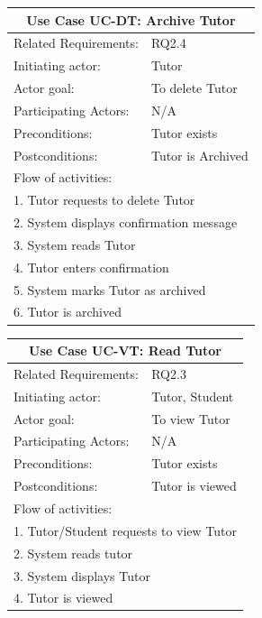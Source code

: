 \documentclass[12pt]{article}
\begin{document}
{		%
		\begin{tabular}{| l | p{10cm}| }
			\hline\multicolumn{2}{|c|}{ \textbf{Use Case UC-DT: Archive Tutor}} \\ \hline
			Related Requirements: & RQ2.4\\ \hline
			Initiating actor: & Tutor\\ \hline
			Actor goal: & To delete Tutor\\ \hline
			Participating Actors: & N/A\\ \hline
			Preconditions:& Tutor exists\\ \hline
			Postconditions: & Tutor is Archived\\ \hline
			\multicolumn{2}{|l|}{Flow of activities:}\\ \hline
			\multicolumn{2}{|p{15cm}|}{1. Tutor requests to delete Tutor}\\
			\multicolumn{2}{|p{15cm}|}{2. System displays confirmation message}\\
			\multicolumn{2}{|p{15cm}|}{3. System reads Tutor}\\
			\multicolumn{2}{|p{15cm}|}{4. Tutor enters confirmation}	\\
			\multicolumn{2}{|p{15cm}|}{5. System marks Tutor as archived }\\
			\multicolumn{2}{|l|}{6. Tutor is archived}
			\\ \hline
		\end{tabular}




		\begin{tabular}{| l | p{10cm}| }
			\hline\multicolumn{2}{|c|}{ \textbf{Use Case UC-VT: Read Tutor}} \\ \hline
			Related Requirements: & RQ2.3\\ \hline
			Initiating actor: & Tutor, Student \\ \hline
			Actor goal: & To view Tutor\\ \hline
			Participating Actors: & N/A\\ \hline
			Preconditions:& Tutor exists\\ \hline
			Postconditions: & Tutor is viewed\\ \hline
			\multicolumn{2}{|l|}{Flow of activities:}\\ \hline
			\multicolumn{2}{|p{15cm}|}{1. Tutor/Student requests to view Tutor}\\
			\multicolumn{2}{|p{15cm}|}{2. System reads tutor}\\
			\multicolumn{2}{|p{15cm}|}{3. System displays Tutor}\\
			\multicolumn{2}{|l|}{4. Tutor is viewed}
			\\ \hline
		\end{tabular}




}
\end{document}
